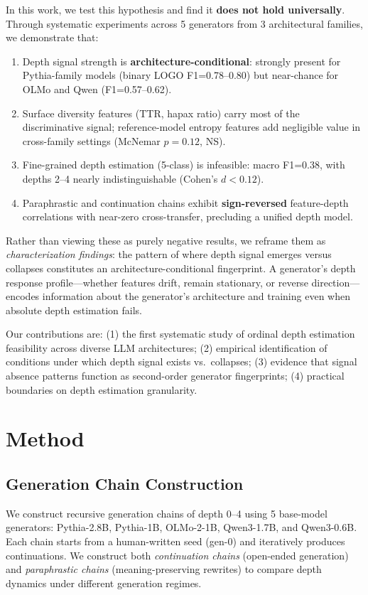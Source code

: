 \documentclass[11pt,a4paper]{article}
\begin{document}
In this work, we test this hypothesis and find it \textbf{does not hold universally}. Through systematic experiments across 5 generators from 3 architectural families, we demonstrate that:

\begin{enumerate}
    \item Depth signal strength is \textbf{architecture-conditional}: strongly present for Pythia-family models (binary LOGO F1=0.78--0.80) but near-chance for OLMo and Qwen (F1=0.57--0.62).
    \item Surface diversity features (TTR, hapax ratio) carry most of the discriminative signal; reference-model entropy features add negligible value in cross-family settings (McNemar $p=0.12$, NS).
    \item Fine-grained depth estimation (5-class) is infeasible: macro F1=0.38, with depths 2--4 nearly indistinguishable (Cohen's $d<0.12$).
    \item Paraphrastic and continuation chains exhibit \textbf{sign-reversed} feature-depth correlations with near-zero cross-transfer, precluding a unified depth model.
\end{enumerate}

Rather than viewing these as purely negative results, we reframe them as \emph{characterization findings}: the pattern of where depth signal emerges versus collapses constitutes an architecture-conditional fingerprint. A generator's depth response profile---whether features drift, remain stationary, or reverse direction---encodes information about the generator's architecture and training even when absolute depth estimation fails.

Our contributions are: (1) the first systematic study of ordinal depth estimation feasibility across diverse LLM architectures; (2) empirical identification of conditions under which depth signal exists vs.\ collapses; (3) evidence that signal absence patterns function as second-order generator fingerprints; (4) practical boundaries on depth estimation granularity.

\section{Method}

\subsection{Generation Chain Construction}

We construct recursive generation chains of depth 0--4 using 5 base-model generators: Pythia-2.8B, Pythia-1B, OLMo-2-1B, Qwen3-1.7B, and Qwen3-0.6B. Each chain starts from a human-written seed (gen-0) and iteratively produces continuations. We construct both \emph{continuation chains} (open-ended generation) and \emph{paraphrastic chains} (meaning-preserving rewrites) to compare depth dynamics under different generation regimes.
\end{document}
